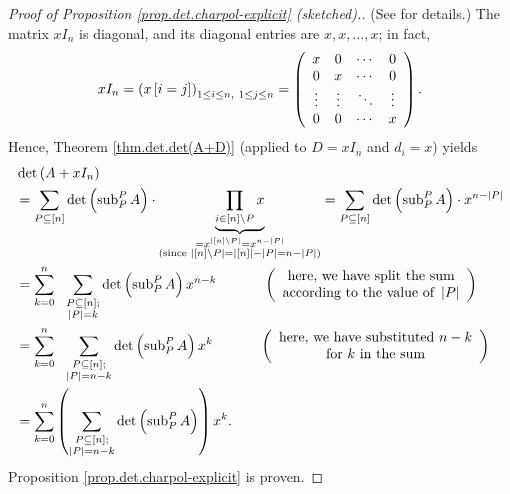 \begin{proof}
[Proof of Proposition \ref{prop.det.charpol-explicit} (sketched).](See
\cite[Corollary 6.164]{detnotes} for details.) The matrix $xI_{n}$ is
diagonal, and its diagonal entries are $x,x,\ldots,x$; in fact,%
\[
xI_{n}=\left(  x\left[  i=j\right]  \right)  _{1\leq i\leq n,\ 1\leq j\leq
n}=\left(
\begin{array}
[c]{cccc}%
x & 0 & \cdots & 0\\
0 & x & \cdots & 0\\
\vdots & \vdots & \ddots & \vdots\\
0 & 0 & \cdots & x
\end{array}
\right)  .
\]
Hence, Theorem \ref{thm.det.det(A+D)} (applied to $D=xI_{n}$ and $d_{i}=x$)
yields%
\begin{align*}
&  \det\left(  A+xI_{n}\right) \\
&  =\sum_{P\subseteq\left[  n\right]  }\det\left(  \operatorname*{sub}%
\nolimits_{P}^{P}A\right)  \cdot\underbrace{\prod_{i\in\left[  n\right]
\setminus P}x}_{\substack{=x^{\left\vert \left[  n\right]  \setminus
P\right\vert }=x^{n-\left\vert P\right\vert }\\\text{(since }\left\vert
\left[  n\right]  \setminus P\right\vert =\left\vert \left[  n\right]
\right\vert -\left\vert P\right\vert =n-\left\vert P\right\vert \text{)}%
}}=\sum_{P\subseteq\left[  n\right]  }\det\left(  \operatorname*{sub}%
\nolimits_{P}^{P}A\right)  \cdot x^{n-\left\vert P\right\vert }\\
&  =\sum_{k=0}^{n}\ \ \sum_{\substack{P\subseteq\left[  n\right]
;\\\left\vert P\right\vert =k}}\det\left(  \operatorname*{sub}\nolimits_{P}%
^{P}A\right)  x^{n-k}\ \ \ \ \ \ \ \ \ \ \left(
\begin{array}
[c]{c}%
\text{here, we have split the sum}\\
\text{according to the value of }\left\vert P\right\vert
\end{array}
\right) \\
&  =\sum_{k=0}^{n}\ \ \sum_{\substack{P\subseteq\left[  n\right]
;\\\left\vert P\right\vert =n-k}}\det\left(  \operatorname*{sub}%
\nolimits_{P}^{P}A\right)  x^{k}\ \ \ \ \ \ \ \ \ \ \left(
\begin{array}
[c]{c}%
\text{here, we have substituted }n-k\\
\text{for }k\text{ in the sum}%
\end{array}
\right) \\
&  =\sum_{k=0}^{n}\left(  \sum_{\substack{P\subseteq\left[  n\right]
;\\\left\vert P\right\vert =n-k}}\det\left(  \operatorname*{sub}%
\nolimits_{P}^{P}A\right)  \right)  x^{k}.
\end{align*}
Proposition \ref{prop.det.charpol-explicit} is proven.
\end{proof}

